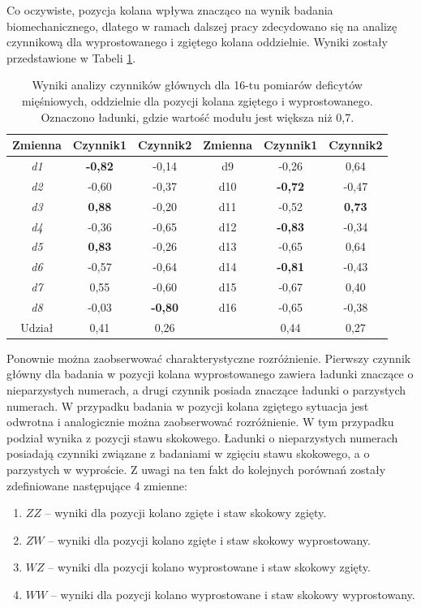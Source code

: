 Co oczywiste, pozycja kolana wpływa znacząco na wynik badania biomechanicznego, dlatego w ramach dalszej pracy zdecydowano się na  analizę czynnikową dla wyprostowanego i zgiętego kolana oddzielnie. Wyniki zostały przedstawione w Tabeli \ref{tab:pca-muscles-knee-strait-bended}. 

\begin{table}[h]
	\centering
	\setlength{\tabcolsep}{3pt}
	\setlength\extrarowheight{2pt}
	\caption{Wyniki analizy czynników głównych dla 16-tu pomiarów deficytów mięśniowych, oddzielnie dla pozycji kolana zgiętego i wyprostowanego. Oznaczono ładunki, gdzie wartość modułu jest większa niż 0,7.}
	\label{tab:pca-muscles-knee-strait-bended}
	\begin{tabular}{c|c|c||c|c|c}
		
		Zmienna&Czynnik1&Czynnik2&Zmienna&Czynnik1&Czynnik2 \\
		\hline \hline
		\textit{d1}&\textbf{-0,82}&-0,14&d9&-0,26&0,64 \\
		\hline
		\textit{d2}&-0,60&-0,37&d10&\textbf{-0,72}&-0,47 \\
		\hline
		\textit{d3}&\textbf{0,88}&-0,20&d11&-0,52&\textbf{0,73} \\
		\hline
		\textit{d4}&-0,36&-0,65&d12&\textbf{-0,83}&-0,34 \\
		\hline
		\textit{d5}&\textbf{0,83}&-0,26&d13&-0,65&0,64 \\
		\hline
		\textit{d6}&-0,57&-0,64&d14&\textbf{-0,81}&-0,43 \\
		\hline
		\textit{d7}&0,55&-0,60&d15&-0,67&0,40 \\
		\hline
		\textit{d8}&-0,03&\textbf{-0,80}&d16&-0,65&-0,38 \\
		\hline\hline
		Udział&0,41&0,26&&0,44&0,27 \\
		
	\end{tabular}
\end{table}

Ponownie można zaobserwować charakterystyczne rozróżnienie. Pierwszy czynnik główny dla badania w pozycji kolana wyprostowanego zawiera ładunki znaczące o nieparzystych numerach, a drugi czynnik posiada znaczące ładunki o parzystych numerach. W przypadku badania w pozycji kolana zgiętego sytuacja jest odwrotna i analogicznie można zaobserwować rozróżnienie. W tym przypadku podział wynika z pozycji stawu skokowego. Ładunki o nieparzystych numerach posiadają czynniki związane z badaniami w zgięciu stawu skokowego, a o parzystych w wyproście. Z uwagi na ten fakt do kolejnych porównań zostały zdefiniowane następujące 4 zmienne:
\begin{enumerate}
	\item $ZZ$ -- wyniki dla pozycji kolano zgięte i staw skokowy zgięty.
	\item $ZW$ -- wyniki dla pozycji kolano zgięte i staw skokowy wyprostowany.
	\item $WZ$ -- wyniki dla pozycji kolano wyprostowane i staw skokowy zgięty.
	\item $WW$ -- wyniki dla pozycji kolano wyprostowane i staw skokowy wyprostowany.
\end{enumerate} 

